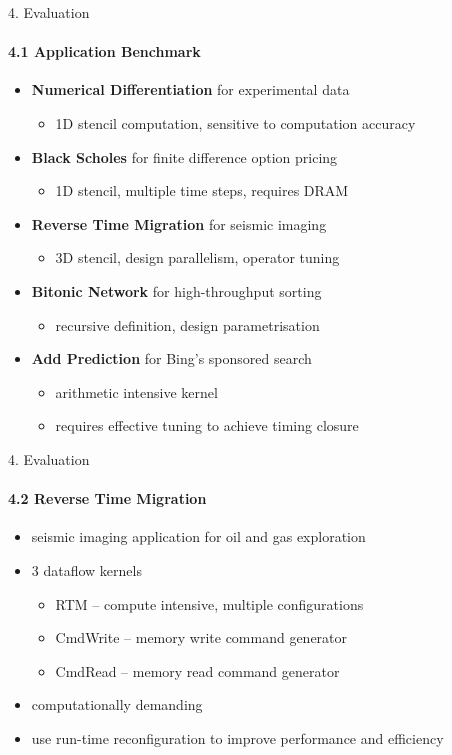 \begin{frame}{4. Evaluation}
  \framesubtitle{4.1 Application Benchmark}

  \begin{itemize}
    \setlength{\itemsep}{10pt}
  \item \textbf{Numerical Differentiation} for experimental data
    \begin{itemize}
    \item 1D stencil computation, sensitive to computation accuracy
    \end{itemize}
  \item \textbf{Black Scholes} for finite difference option pricing
    \begin{itemize}
    \item 1D stencil, multiple time steps, requires DRAM
    \end{itemize}
  \item \textbf{Reverse Time Migration} for seismic imaging
    \begin{itemize}
    \item 3D stencil, design parallelism, operator tuning
    \end{itemize}
  \item \textbf{Bitonic Network} for high-throughput sorting
    \begin{itemize}
    \item recursive definition, design parametrisation
    \end{itemize}
  \item \textbf{Add Prediction} for Bing's sponsored search
    \begin{itemize}
    \item arithmetic intensive kernel
    \item requires effective tuning to achieve timing closure
    \end{itemize}
  \end{itemize}
\end{frame}

\begin{frame}{4. Evaluation}
  \framesubtitle{4.2 Reverse Time Migration}
  \begin{itemize}
  \item seismic imaging application for oil and gas exploration
  \item 3 dataflow kernels
    \begin{itemize}
    \item RTM -- compute intensive, multiple configurations
    \item CmdWrite -- memory write command generator
    \item CmdRead -- memory read command generator
    \end{itemize}
  \item computationally demanding
  \item use run-time reconfiguration to improve performance and efficiency
  \end{itemize}
\end{frame}


